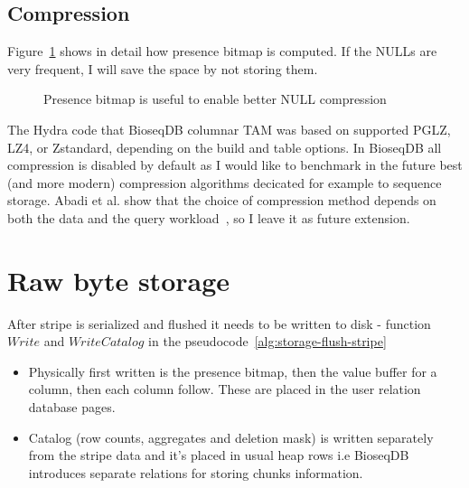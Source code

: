 \subsection{Compression}

Figure~\ref{fig:storage-column-streams} shows in detail how presence bitmap is computed.
If the NULLs are very frequent, I will save the space by not storing them.

\begin{figure}[H]
\centering
{}
\caption{Presence bitmap is useful to enable better NULL compression}
\label{fig:storage-column-streams}
\end{figure}

The Hydra code that BioseqDB columnar TAM was based on supported PGLZ, LZ4, or Zstandard, depending on the
build and table options. In BioseqDB all compression is disabled by default as I would like to benchmark in the future best (and more modern) compression algorithms decicated for example to sequence storage.
Abadi et al. show that the choice of compression method depends on both
the data and the query workload~\autocite{abadi2006compression}, so I leave it as future extension.

\section{Raw byte storage}
\label{sec:pg-storage-pages}

After stripe is serialized and flushed it needs to be written to disk - function $Write$ and $WriteCatalog$ in the pseudocode~\ref{alg:storage-flush-stripe}
\begin{itemize}
  \item Physically first written is the presence bitmap, then the value buffer for a column, then each column follow. These are placed in the user relation database pages.
  \item Catalog (row counts, aggregates and deletion mask) is written separately from the stripe data and it's placed in usual heap rows i.e BioseqDB introduces separate relations for storing chunks information.
\end{itemize}

